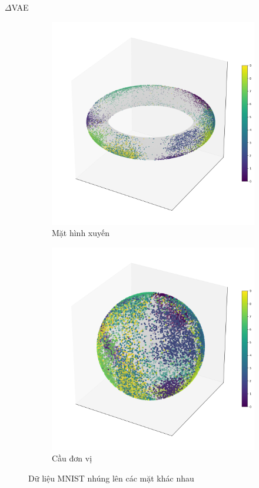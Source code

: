 \documentclass[tocsection,footlinesection,aspectratio=169,mathserif]{beamer}
\begin{document}
\begin{frame}{$\Delta$VAE}
	\begin{figure}
		\begin{subfigure}{0.49\textwidth}
			\centering
			\includegraphics[height=\graphicht]{figures/mnist-latent-torus.png}
			\caption{Mặt hình xuyến}
		\end{subfigure}
		\begin{subfigure}{0.49\textwidth}
			\centering
			\includegraphics[height=\graphicht]{figures/mnist-latent-sphere_all.png}
			\caption{Cầu đơn vị}
		\end{subfigure}
		\caption{Dữ liệu MNIST nhúng lên các mặt khác nhau}
	\end{figure}
\end{frame}
\end{document}
